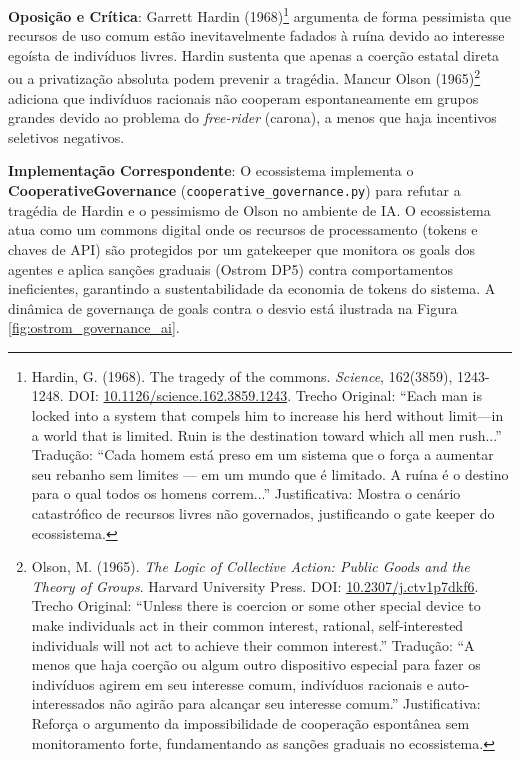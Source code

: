 \documentclass[12pt,a4paper,oneside]{abntex2}
\begin{document}
\textbf{Oposição e Crítica}: Garrett Hardin (1968)\footnote{Hardin, G. (1968). The tragedy of the commons. \textit{Science}, 162(3859), 1243-1248. DOI: \href{https://doi.org/10.1126/science.162.3859.1243}{10.1126/science.162.3859.1243}. Trecho Original: ``Each man is locked into a system that compels him to increase his herd without limit—in a world that is limited. Ruin is the destination toward which all men rush...'' Tradução: ``Cada homem está preso em um sistema que o força a aumentar seu rebanho sem limites — em um mundo que é limitado. A ruína é o destino para o qual todos os homens correm...'' Justificativa: Mostra o cenário catastrófico de recursos livres não governados, justificando o gate keeper do ecossistema.} argumenta de forma pessimista que recursos de uso comum estão inevitavelmente fadados à ruína devido ao interesse egoísta de indivíduos livres. Hardin sustenta que apenas a coerção estatal direta ou a privatização absoluta podem prevenir a tragédia. Mancur Olson (1965)\footnote{Olson, M. (1965). \textit{The Logic of Collective Action: Public Goods and the Theory of Groups}. Harvard University Press. DOI: \href{https://doi.org/10.2307/j.ctv1p7dkf6}{10.2307/j.ctv1p7dkf6}. Trecho Original: ``Unless there is coercion or some other special device to make individuals act in their common interest, rational, self-interested individuals will not act to achieve their common interest.'' Tradução: ``A menos que haja coerção ou algum outro dispositivo especial para fazer os indivíduos agirem em seu interesse comum, indivíduos racionais e auto-interessados não agirão para alcançar seu interesse comum.'' Justificativa: Reforça o argumento da impossibilidade de cooperação espontânea sem monitoramento forte, fundamentando as sanções graduais no ecossistema.} adiciona que indivíduos racionais não cooperam espontaneamente em grupos grandes devido ao problema do \textit{free-rider} (carona), a menos que haja incentivos seletivos negativos.

\textbf{Implementação Correspondente}: O ecossistema implementa o \textbf{CooperativeGovernance} (\texttt{cooperative\_governance.py}) para refutar a tragédia de Hardin e o pessimismo de Olson no ambiente de IA. O ecossistema atua como um commons digital onde os recursos de processamento (tokens e chaves de API) são protegidos por um gatekeeper que monitora os goals dos agentes e aplica sanções graduais (Ostrom DP5) contra comportamentos ineficientes, garantindo a sustentabilidade da economia de tokens do sistema. A dinâmica de governança de goals contra o desvio está ilustrada na Figura \ref{fig:ostrom_governance_ai}.
\end{document}
